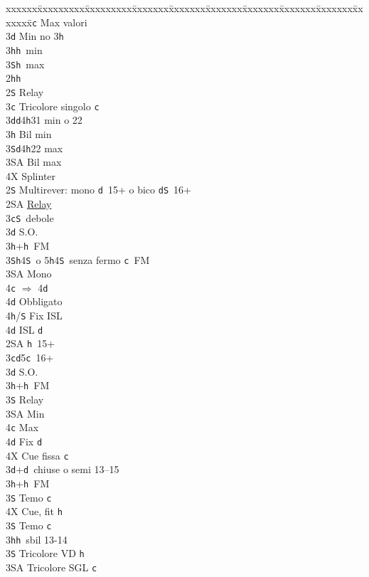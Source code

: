 \documentclass[a4paper,italian]{article}
\newcommand{\BS}{\small{\texttt{S}}}
\newcommand{\BC}{\small{\texttt{c}}}
\newcommand{\BD}{\small{\texttt{d}}}
\newcommand{\BH}{\small{\texttt{h}}}
\newenvironment{bidtable}
{\begin{tabbing}

    xxxxxx\=xxxxxxxxx\=xxxxxxxxx\=xxxxxxx\=xxxxxxx\=xxxxxxx\=xxxxxxx\=xxxxxxx\=xxxxxxx\=xxxxxxx\=\kill}
{\end{tabbing} }%
\begin{document}
\begin{multicols}{2}
\begin{bidtable}
        3\BC \> Max valori\\
        3\BD \> Min no 3\BH \\
        3\BH {}\BH\ min\\
        3\BS {}\BH\ max\-\-\\
        2\BH {}\BH \+\\
        2\BS \> Relay\+\\
        3\BC \> Tricolore singolo \BC \\
        3\BD {}\BD 4\BH 31 min o 22\\
        3\BH \> Bil min\\
        3\BS {}\BD 4\BH 22 max\\
        3\small{SA} \> Bil max\\
        4X \> Splinter\-\-\\
        2\BS \> Multirever: mono \BD\ 15+ o bico \BD \BS\ 16+\+\\
        2\small{SA} \> \hyperref[multirever]{Relay}\\
        3\BC {}\BS\ debole\\
        3\BD \> S.O.\\
        3\BH {}+\BH\ FM\\
        3\BS {}\BH 4\BS\ o 5\BH 4\BS\ senza fermo \BC\ FM\+\\
        3\small{SA} \> Mono\\
        4\BC \> $\Rightarrow$ 4\BD \+\\
        4\BD \> Obbligato\+\\
        4\BH/\BS \> Fix ISL\-\-\\
        4\BD \> ISL \BD \-\-\\
        2\small{SA} \BH\ 15+\\
        3\BC {}\BD 5\BC\ 16+\+\\
        3\BD \> S.O.\\
        3\BH {}+\BH\ FM\\
        3\BS \> Relay\+\\
        3\small{SA} \> Min\\
        4\BC \> Max\+\\
        4\BD \> Fix \BD \\
        4X \> Cue fissa \BC \-\-\-\\
        3\BD {}+\BD\ chiuse o semi 13--15\+\\
        3\BH {}+\BH\ FM\+\\
        3\BS \> Temo \BC \\
        4X \> Cue, fit \BH \-\\
        3\BS \> Temo \BC \-\\
        3\BH {}\BH\ sbil 13-14\\
        3\BS \> Tricolore VD \BH \\
        3\small{SA} \> Tricolore SGL \BC \-
    \end{bidtable}


\end{multicols}
\end{document}
